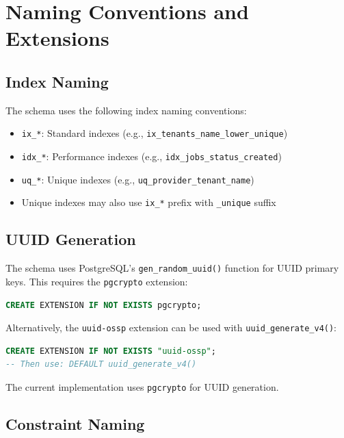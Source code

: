 \section{Naming Conventions and Extensions}
\label{app:db:naming}

\subsection{Index Naming}

The schema uses the following index naming conventions:

\begin{itemize}
    \item \texttt{ix\_*}: Standard indexes (e.g., \texttt{ix\_tenants\_name\_lower\_unique})
    \item \texttt{idx\_*}: Performance indexes (e.g., \texttt{idx\_jobs\_status\_created})
    \item \texttt{uq\_*}: Unique indexes (e.g., \texttt{uq\_provider\_tenant\_name})
    \item Unique indexes may also use \texttt{ix\_*} prefix with \texttt{\_unique} suffix
\end{itemize}

\subsection{UUID Generation}

The schema uses PostgreSQL's \texttt{gen\_random\_uuid()} function for UUID primary keys. This requires the \texttt{pgcrypto} extension:

\begin{lstlisting}[language=SQL]
CREATE EXTENSION IF NOT EXISTS pgcrypto;
\end{lstlisting}

Alternatively, the \texttt{uuid-ossp} extension can be used with \texttt{uuid\_generate\_v4()}:

\begin{lstlisting}[language=SQL]
CREATE EXTENSION IF NOT EXISTS "uuid-ossp";
-- Then use: DEFAULT uuid_generate_v4()
\end{lstlisting}

The current implementation uses \texttt{pgcrypto} for UUID generation.

\subsection{Constraint Naming}

